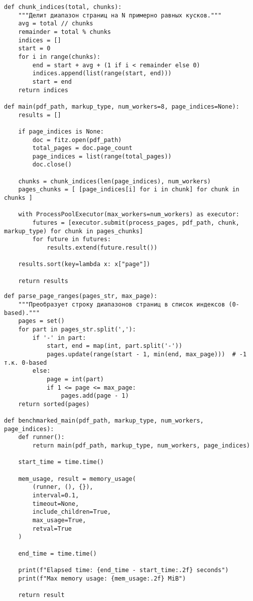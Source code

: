 \newpage

\begin{lstlisting}[caption={Скрипт, используемый в исследовании (часть 2)}, label={lst:}]
def chunk_indices(total, chunks):
    """Делит диапазон страниц на N примерно равных кусков."""
    avg = total // chunks
    remainder = total % chunks
    indices = []
    start = 0
    for i in range(chunks):
        end = start + avg + (1 if i < remainder else 0)
        indices.append(list(range(start, end)))
        start = end
    return indices

def main(pdf_path, markup_type, num_workers=8, page_indices=None):
    results = []

    if page_indices is None:
        doc = fitz.open(pdf_path)
        total_pages = doc.page_count
        page_indices = list(range(total_pages))
        doc.close()

    chunks = chunk_indices(len(page_indices), num_workers)
    pages_chunks = [ [page_indices[i] for i in chunk] for chunk in chunks ]

    with ProcessPoolExecutor(max_workers=num_workers) as executor:
        futures = [executor.submit(process_pages, pdf_path, chunk, markup_type) for chunk in pages_chunks]
        for future in futures:
            results.extend(future.result())

    results.sort(key=lambda x: x["page"])

    return results
\end{lstlisting}

\newpage

\begin{lstlisting}[caption={Скрипт, используемый в исследовании (часть 3)}, label={lst:}]
def parse_page_ranges(pages_str, max_page):
    """Преобразует строку диапазонов страниц в список индексов (0-based)."""
    pages = set()
    for part in pages_str.split(','):
        if '-' in part:
            start, end = map(int, part.split('-'))
            pages.update(range(start - 1, min(end, max_page)))  # -1 т.к. 0-based
        else:
            page = int(part)
            if 1 <= page <= max_page:
                pages.add(page - 1)
    return sorted(pages)

def benchmarked_main(pdf_path, markup_type, num_workers, page_indices):
    def runner():
        return main(pdf_path, markup_type, num_workers, page_indices)

    start_time = time.time()

    mem_usage, result = memory_usage(
        (runner, (), {}),
        interval=0.1,
        timeout=None,
        include_children=True,
        max_usage=True,
        retval=True
    )

    end_time = time.time()

    print(f"Elapsed time: {end_time - start_time:.2f} seconds")
    print(f"Max memory usage: {mem_usage:.2f} MiB")

    return result
\end{lstlisting}


